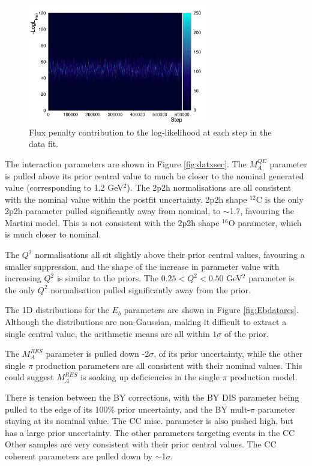 \begin{figure}[!htbp]
\centering
\includegraphics*[width=0.7\textwidth,clip]{figs/llh_fluxdat}
\caption{Flux penalty contribution to the log-likelihood at each step in the data fit.}\label{fig:llh_fluxdat}
\end{figure}

The interaction parameters are shown in Figure \ref{fig:datxsec}. The $M^{QE}_A$ parameter is pulled above its prior central value to much be closer to the nominal generated value (corresponding to 1.2 GeV$^2$). The 2p2h normalisations are all consistent with the nominal value within the postfit uncertainty. 2p2h shape $^{12}$C is the only 2p2h parameter pulled significantly away from nominal, to $\sim$1.7, favouring the Martini model. This is not consistent with the 2p2h shape $^{16}$O parameter, which is much closer to nominal.

The $Q^2$ normalisations all sit slightly above their prior central values, favouring a smaller suppression, and the shape of the increase in parameter value with increasing $Q^2$ is similar to the priors. The $0.25 < Q^2< 0.50$ GeV$^2$ parameter is the only $Q^2$ normalisation pulled significantly away from the prior.

The 1D distributions for the $E_b$ parameters are shown in Figure \ref{fig:Ebdatares}. Although the distributions are non-Gaussian, making it difficult to extract a single central value, the arithmetic means are all within $1\sigma$ of the prior.

The $M_A^{RES}$ parameter is pulled down -2$\sigma$, of its prior uncertainty, while the other single $\pi$ production parameters are all consistent with their nominal values. This could suggest $M_A^{RES}$ is soaking up deficiencies in the single $\pi$ production model.

There is tension between the BY corrections, with the BY DIS parameter being pulled to the edge of its 100$\%$ prior uncertainty, and the BY mult-$\pi$ parameter staying at its nominal value. The CC misc. parameter is also pushed high, but has a large prior uncertainty. The other parameters targeting events in the CC Other samples are very consistent with their prior central values. The CC coherent parameters are pulled down by $\sim$1$\sigma$.

